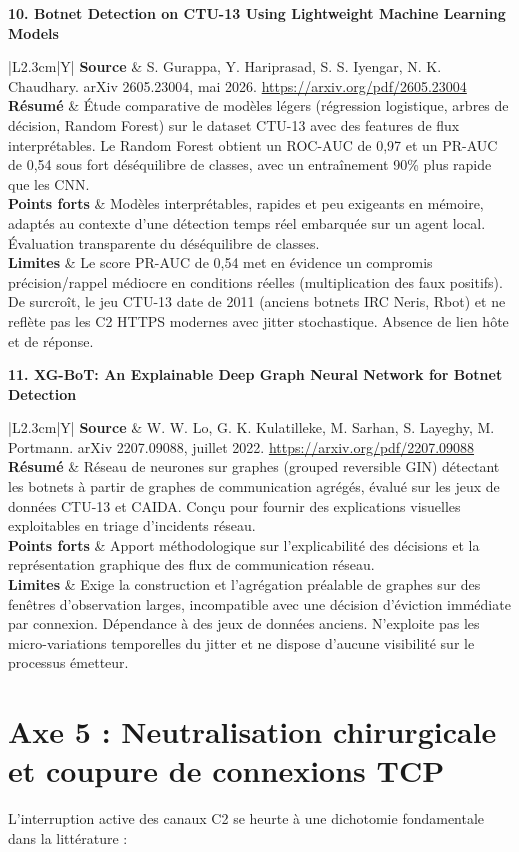 \documentclass[10pt,a4paper]{article}
\newcommand{\articlecard}[5]{
    \noindent\textbf{#1}\par\vspace{1.2mm}
    \noindent\begin{tabularx}{\textwidth}{|L{2.3cm}|Y|}
        \hline
        \textbf{Source} & #2 \\ \hline
        \textbf{Résumé} & #3 \\ \hline
        \textbf{Points forts} & #4 \\ \hline
        \textbf{Limites} & #5 \\ \hline
    \end{tabularx}
    \vspace{3.5mm}
}
\begin{document}
\articlecard{10. Botnet Detection on CTU-13 Using Lightweight Machine Learning Models}{
S. Gurappa, Y. Hariprasad, S. S. Iyengar, N. K. Chaudhary. arXiv 2605.23004, mai 2026.\newline
\url{https://arxiv.org/pdf/2605.23004}
}{
Étude comparative de modèles légers (régression logistique, arbres de décision, Random Forest) sur le dataset CTU-13 avec des features de flux interprétables. Le Random Forest obtient un ROC-AUC de 0,97 et un PR-AUC de 0,54 sous fort déséquilibre de classes, avec un entraînement 90\% plus rapide que les CNN.
}{
Modèles interprétables, rapides et peu exigeants en mémoire, adaptés au contexte d'une détection temps réel embarquée sur un agent local. Évaluation transparente du déséquilibre de classes.
}{
Le score PR-AUC de 0,54 met en évidence un compromis précision/rappel médiocre en conditions réelles (multiplication des faux positifs). De surcroît, le jeu CTU-13 date de 2011 (anciens botnets IRC Neris, Rbot) et ne reflète pas les C2 HTTPS modernes avec jitter stochastique. Absence de lien hôte et de réponse.
}

\articlecard{11. XG-BoT: An Explainable Deep Graph Neural Network for Botnet Detection}{
W. W. Lo, G. K. Kulatilleke, M. Sarhan, S. Layeghy, M. Portmann. arXiv 2207.09088, juillet 2022.\newline
\url{https://arxiv.org/pdf/2207.09088}
}{
Réseau de neurones sur graphes (grouped reversible GIN) détectant les botnets à partir de graphes de communication agrégés, évalué sur les jeux de données CTU-13 et CAIDA. Conçu pour fournir des explications visuelles exploitables en triage d'incidents réseau.
}{
Apport méthodologique sur l'explicabilité des décisions et la représentation graphique des flux de communication réseau.
}{
Exige la construction et l'agrégation préalable de graphes sur des fenêtres d'observation larges, incompatible avec une décision d'éviction immédiate par connexion. Dépendance à des jeux de données anciens. N'exploite pas les micro-variations temporelles du jitter et ne dispose d'aucune visibilité sur le processus émetteur.
}

\section*{Axe 5 : Neutralisation chirurgicale et coupure de connexions TCP}

L'interruption active des canaux C2 se heurte à une dichotomie fondamentale dans la littérature :
\end{document}
